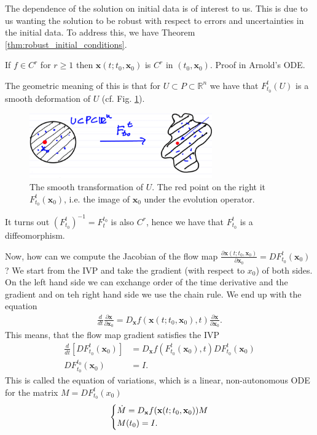 The dependence of the solution on initial data is of interest to us. This is due to us wanting the solution to be robust with respect to errors and uncertainties in the initial data. To address this, we have Theorem \ref{thm:robust_initial_conditions}.
\begin{theorem}[]
	If $f \in C^r$ for $r\geq 1$ then $ \textbf{x}(t; t_0,  \textbf{x}_0)$ is $C^r$ in $(t_0,  \textbf{x}_0)$. Proof in Arnold's ODE.
	\label{thm:robust_initial_conditions}
\end{theorem}

The geometric meaning of this is that for $U \subset P \subset \mathbb{R}^{n}$ we have that $F_{t_0}^{t}(U)$ is a smooth deformation of $U$ (cf. Fig. \ref{fig:deformation}).
\begin{figure}[h!]
	\centering
	\includegraphics[width=0.7\textwidth]{figures/ch1/7smooth_transform.png}
	\caption{The smooth transformation of $U$. The red point on the right it $F _{t_0}^t( \textbf{x}_0)$, i.e. the image of $ \textbf{x}_0$ under the evolution operator.}
	\label{fig:deformation}
\end{figure}
It turns out $\left(F_{t_0}^{t}\right)^{-1} = F_{t}^{t_0}$ is also $C^r$, hence we have that $F_{t_0}^{t}$ is a diffeomorphism. 

Now, how can we compute the Jacobian of the flow map $\frac{\partial  \textbf{x}(t; t_0,  \textbf{x}_0)}{ \partial  \textbf{x}_0} = DF _{t_0}^{t}( \textbf{x}_0)$? We start from the IVP and take the gradient (with respect to $x_0$) of both sides. On the left hand side we can exchange order of the time derivative and the gradient and on teh right hand side we use the chain rule. We end up with the equation
\begin{align}
	\frac{d}{dt}\frac{\partial  \textbf{x}}{\partial  \textbf{x}_0} = D_ \textbf{x} f( \textbf{x}(t; t_0,  \textbf{x}_0), t) \frac{\partial  \textbf{x}}{\partial  \textbf{x}_0}.
\end{align}
This means, that the flow map gradient satisfies the IVP
\begin{align}
	\frac{d}{dt}\left[ DF_{t_0}^{t}( \textbf{x}_0)\right] &= D_{ \textbf{x}}f(F_{t_0}^{t}( \textbf{x}_0), t) DF_{t_0}^{t}( \textbf{x}_0) \\
	DF_{t_0}^{t_0}( \textbf{x}_0) &= I.
\end{align}
This is called the equation of variations, which is a linear, non-autonomous ODE for the matrix $M = DF_{t_0}^{t}(x_0)$
\begin{align}
	\begin{dcases}
		\dot{M} = D_ \textbf{x} f( \textbf{x}(t; t_0,  \textbf{x}_0)) M \\ M(t_0) = I.
	\end{dcases}
\end{align}

